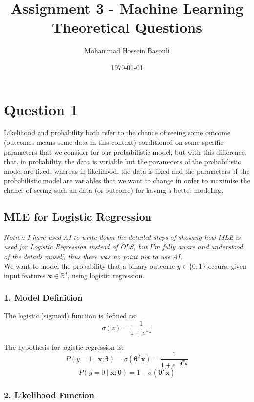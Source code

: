 \documentclass[a4paper,12pt]{article}
\begin{document}
\title{Assignment 3 - Machine Learning \\
Theoretical Questions}
\author{Mohammad Hossein Basouli}
\date{\today}
\maketitle

\section*{Question 1}
Likelihood and probability both refer to the chance of seeing some outcome (outcomes means some data in this context) conditioned on some specific parameters that we consider for our
probabilistic model, but with this difference, that, in probability, the data is variable but the parameters of the probabilistic model are fixed, whereas in likelihood, the data is fixed 
and the parameters of the probabilistic model are variables that we want to change in order to maximize the chance of seeing such an data (or outcome) for having a better modeling.
\subsection*{MLE for Logistic Regression}
\textit{Notice: I have used AI to write down the detailed steps of showing how MLE is used for Logistic Regression instead of OLS, but I'm fully aware and understood of the details myself, thus there was no point not to use AI.} \\

\noindent We want to model the probability that a binary outcome $y \in \{0, 1\}$ occurs, given input features $\mathbf{x} \in \mathbb{R}^d$, using logistic regression.

\subsubsection*{1. Model Definition}

The logistic (sigmoid) function is defined as:
\[
\sigma(z) = \frac{1}{1 + e^{-z}}
\]

The hypothesis for logistic regression is:
\[
P(y = 1 \mid \mathbf{x}; \boldsymbol{\theta}) = \sigma(\boldsymbol{\theta}^T \mathbf{x}) = \frac{1}{1 + e^{-\boldsymbol{\theta}^T \mathbf{x}}}
\]
\[
P(y = 0 \mid \mathbf{x}; \boldsymbol{\theta}) = 1 - \sigma(\boldsymbol{\theta}^T \mathbf{x})
\]

\subsubsection*{2. Likelihood Function}
\end{document}
